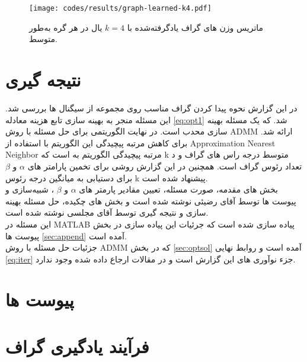 \documentclass[10pt,twocolumn,a4paper]{article}
\begin{document}
	\begin{figure}[H]
		\centering
		\texttt{[image: codes/results/graph-learned-k4.pdf]}
		\caption{
			ماتریس وزن های گراف یادگرفته‌شده با \( k = 4 \) یال در هر گره به‌طور متوسط.
		}
		\label{fig:graph-learned-k4-1}
	\end{figure}
	
	\section{نتیجه گیری}
	در این گزارش نحوه پیدا کردن گراف مناسب روی مجموعه از سیگنال ها بررسی شد. این مسئله منجر به بهینه سازی تابع هزینه معادله
	\ref{eq:opt1}
	شد. که یک مسئله بهینه سازی محدب است. در نهایت الگوریتمی برای حل مسئله با روش ADMM ارائه شد. برای کاهش مرتبه پیچیدگی این الگوریتم با استفاده از Approximation Nearest Neighbor مرتبه پیچیدگی الگوریتم به
	است که k متوسط درجه راس های گراف و د تعداد رئوس گراف است. همچنین در این گزارش روشی برای تخمین پارامتر های $\alpha$ و $\beta$ برای دستیابی به میانگین درجه رئوس k پیشنهاد شده است. \\
	
	بخش های مقدمه، صورت مسئله، تعیین مقادیر پارمتر های 
	$\alpha$ و $\beta$
	، شبیه‌سازی و پیوست ها توسط آقای رضیئی نوشته شده است و بخش های چکیده، حل مسئله بهینه سازی و نتیجه گیری توسط آقای مجلسی نوشته شده است.\\
	
	این مسئله در MATLAB پیاده سازی شده است که جرئیات این پیاده سازی در  بخش پیوست ها
	\ref{sec:append}
	آمده است. \\
	
	جزئیات حل مسئله با روش ADMM که در بخش
	\ref{sec:optsol}
	آمده است و روابط نهایی 
	\ref{eq:iter}
	جزء نوآوری های این گزارش است و در مقالات ارجاع داده شده وجود ندارد.
	

	
	
	
	
	\nocite{*}
	
	
	
	\clearpage
	
	\section*{پیوست ها}\label{sec:append}
	\appendix
	
	\section{فرآیند یادگیری گراف}
	
\end{document}
